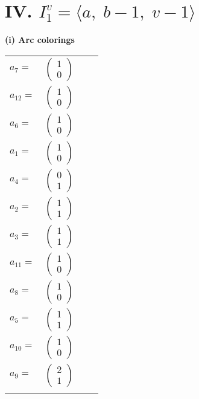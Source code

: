 \documentclass[1p]{elsarticle_modified}
\theoremstyle{definition}
\begin{document}
\centering \section*{IV. $I^v_{1}= \langle a,\;b-1,\;v-1 \rangle$}
\flushleft \textbf{(i) Arc colorings}\\
\begin{tabular}{m{7pt} m{180pt} m{7pt} m{180pt} }
\flushright $a_{7}=$&$\begin{pmatrix}1\\0\end{pmatrix}$ \\
\flushright $a_{12}=$&$\begin{pmatrix}1\\0\end{pmatrix}$ \\
\flushright $a_{6}=$&$\begin{pmatrix}1\\0\end{pmatrix}$ \\
\flushright $a_{1}=$&$\begin{pmatrix}1\\0\end{pmatrix}$ \\
\flushright $a_{4}=$&$\begin{pmatrix}0\\1\end{pmatrix}$ \\
\flushright $a_{2}=$&$\begin{pmatrix}1\\1\end{pmatrix}$ \\
\flushright $a_{3}=$&$\begin{pmatrix}1\\1\end{pmatrix}$ \\
\flushright $a_{11}=$&$\begin{pmatrix}1\\0\end{pmatrix}$ \\
\flushright $a_{8}=$&$\begin{pmatrix}1\\0\end{pmatrix}$ \\
\flushright $a_{5}=$&$\begin{pmatrix}1\\1\end{pmatrix}$ \\
\flushright $a_{10}=$&$\begin{pmatrix}1\\0\end{pmatrix}$ \\
\flushright $a_{9}=$&$\begin{pmatrix}2\\1\end{pmatrix}$\\&\end{tabular}
\end{document}
